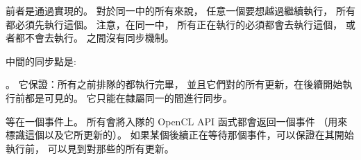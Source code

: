 前者是通過實現的。
對於同一中的所有來說，
任意一個要想越過繼續執行，
所有都必須先執行這個。
注意，在同一中，
所有正在執行的必須都會去執行這個，
或者都不會去執行。
之間沒有同步機制。

中間的同步點是:
\startigBase
\item {}。
它保證：所有之前排隊的都執行完畢，
並且它們對的所有更新，在後續開始執行前都是可見的。
它只能在隸屬同一的間進行同步。

\item 等在一個事件上。
所有會將入隊的 OpenCL API 函式都會返回一個事件
（用來標識這個以及它所更新的）。
如果某個後續正在等待那個事件，可以保證在其開始執行前，
可以見到對那些的所有更新。
\stopigBase

